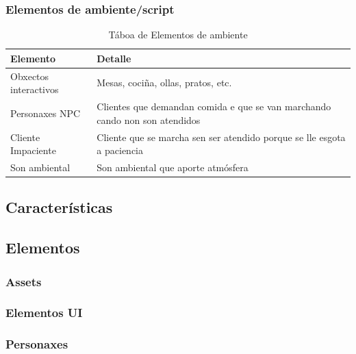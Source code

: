 \documentclass{report}  %
\begin{document}
\subsubsection{Elementos de ambiente/script}
\begin{table}[h]
    \centering
    \renewcommand{\arraystretch}{1.3} %
    \setlength{\tabcolsep}{10pt} %
    \label{tab:elementos}
    \begin{tabular}{|p{4cm}|p{9cm}|}
        \hline
        \rowcolor{octopus} %
        \textbf{Elemento}  & \textbf{Detalle} \\
        \hline
        Obxectos interactivos & Mesas, cociña, ollas, pratos, etc. \\
        \hline
        Personaxes NPC & Clientes que demandan comida e que se van marchando cando non son atendidos \\
        \hline
        Cliente Impaciente & Cliente que se marcha sen ser atendido porque se lle esgota a paciencia \\
        \hline
        Son ambiental & Son ambiental que aporte atmósfera \\
        \hline
    \end{tabular}
    \caption{Táboa de Elementos de ambiente}
\end{table}



\subsection{Características}

\subsection{Elementos}

\subsubsection{Assets}

\subsubsection{Elementos UI}

\subsubsection{Personaxes}
\end{document}
